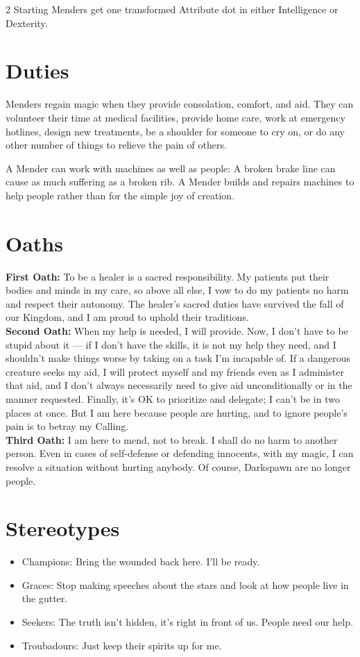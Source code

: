 \begin{multicols}{2}
Starting Menders get one transformed Attribute dot in either Intelligence or Dexterity. 

\section*{Duties}

Menders regain magic when they provide consolation, comfort, and aid. They can volunteer their time at medical facilities, provide home care, work at emergency hotlines, design new treatments, be a shoulder for someone to cry on, or do any other number of things to relieve the pain of others. 

A Mender can work with machines as well as people: A broken brake line can cause as much suffering as a broken rib. A Mender builds and repairs machines to help people rather than for the simple joy of creation. 

\section*{Oaths}
\noindent \textbf{First Oath:} To be a healer is a sacred responsibility. My patients put their bodies and minds in my care, so above all else, I vow to do my patients no harm and respect their autonomy. The healer's sacred duties have survived the fall of our Kingdom, and I am proud to uphold their traditions. \\

\noindent \textbf{Second Oath:} When my help is needed, I will provide. Now, I don't have to be stupid about it — if I don't have the skills, it is not my help they need, and I shouldn't make things worse by taking on a task I'm incapable of. If a dangerous creature seeks my aid, I will protect myself and my friends even as I administer that aid, and I don't always necessarily need to give aid unconditionally or in the manner requested. Finally, it's OK to prioritize and delegate; I can't be in two places at once. But I am here because people are hurting, and to ignore people's pain is to betray my Calling. \\

\noindent \textbf{Third Oath:} I am here to mend, not to break. I shall do no harm to another person. Even in cases of self-defense or defending innocents, with my magic, I can resolve a situation without hurting anybody. Of course, Darkspawn are no longer people.

\section*{Stereotypes}
\begin{itemize}
\item Champions: Bring the wounded back here. I'll be ready. 
\item Graces: Stop making speeches about the stars and look at how people live in the gutter. 
\item Seekers: The truth isn't hidden, it's right in front of us. People need our help. 
\item Troubadours: Just keep their spirits up for me. 
 

\end{itemize}
\end{multicols}
